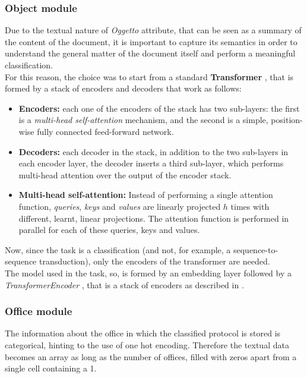 \documentclass[12pt]{article}
\begin{document}
\subsubsection{Object module}\label{sec:object-module}
Due to the textual nature of \textit{Oggetto} attribute, that can be seen as a summary of the content of the document, it is important to capture its semantics in order to understand the general matter of the document itself and perform a meaningful classification.\\
For this reason, the choice was to start from a standard \textbf{Transformer} \cite{attention_is_all_you_need, pytorch_transformer}, that is formed by a stack of encoders and decoders that work as follows:
\begin{itemize}
    \item \textbf{Encoders:} each one of the encoders of the stack has two sub-layers: the first is a \textit{multi-head self-attention} mechanism, and the second is a simple, position-wise fully connected feed-forward network.
    \item \textbf{Decoders:} each decoder in the stack, in addition to the two sub-layers in each encoder layer, the decoder inserts a third sub-layer, which performs multi-head attention over the output of the encoder stack.
    \item \textbf{Multi-head self-attention:} Instead of performing a single attention function, \textit{queries}, \textit{keys} and \textit{values} are linearly projected $h$ times with different, learnt, linear projections. The attention function is performed in parallel for each of these queries, keys and values.
\end{itemize}
Now, since the task is a classification (and not, for example, a sequence-to-sequence transduction), only the encoders of the transformer are needed.\\
The model used in the task, so, is formed by an embedding layer \cite{pytorch_embedding} followed by a \textit{TransformerEncoder} \cite{pytorch_transformerencoder}, that is a stack of encoders as described in \cite{attention_is_all_you_need}.

\subsubsection{Office module}\label{sec:office-module}
The information about the office in which the classified protocol is stored is categorical, hinting to the use of one hot encoding. Therefore the textual data becomes an array as long as the number of offices, filled with zeros apart from a single cell containing a 1.
\end{document}
